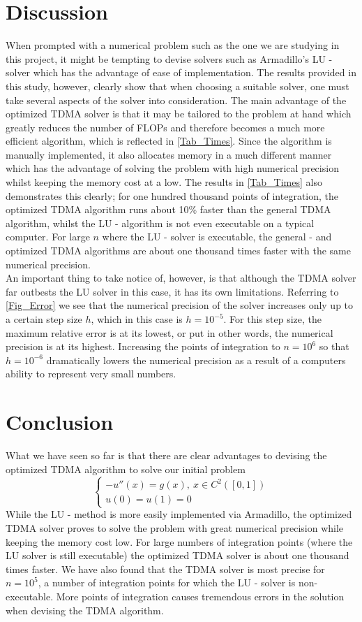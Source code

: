 \documentclass[a4paper, english]{amsart} %
\begin{document}
\section{Discussion}
When prompted with a numerical problem such as the one we are studying in this project, it might be tempting to devise solvers such as Armadillo's LU - solver which has the advantage of ease of implementation. The results provided in this study, however, clearly show that when choosing a suitable solver, one must take several aspects of the solver into consideration. The main advantage of the optimized TDMA solver is that it may be tailored to the problem at hand which greatly reduces the number of FLOPs and therefore becomes a much more efficient algorithm, which is reflected in \autoref{Tab_Times}. Since the algorithm is manually implemented, it also allocates memory in a much different manner which has the advantage of solving the problem with high numerical precision whilst keeping the memory cost at a low. The results in \autoref{Tab_Times} also demonstrates this clearly; for one hundred thousand points of integration, the optimized TDMA algorithm runs about 10\% faster than the general TDMA algorithm, whilst the LU - algorithm is not even executable on a typical computer. For large $n$ where the LU - solver is executable, the general - and optimized TDMA algorithms are about one thousand times faster with the same numerical precision.\\

An important thing to take notice of, however, is that although the TDMA solver far outbests the LU solver in this case, it has its own limitations. Referring to \autoref{Fig_Error} we see that the numerical precision of the solver increases only up to a certain step size $h$, which in this case is $h = 10^{-5}$. For this step size, the maximum relative error is at its lowest, or put in other words, the numerical precision is at its highest. Increasing the points of integration to $n = 10^6$ so that $h = 10^{-6}$ dramatically lowers the numerical precision as a result of a computers ability to represent very small numbers. 
\section{Conclusion}
What we have seen so far is that there are clear advantages to devising the optimized TDMA algorithm to solve our initial problem 
$$
\begin{cases}
-u''(x) = g(x), \ x\in C^2([0,1])\\
u(0) = u(1) = 0
\end{cases}
$$
While the LU - method is more easily implemented via Armadillo, the optimized TDMA solver proves to solve the problem with great numerical precision while keeping the memory cost low. For large numbers of integration points (where the LU solver is still executable) the optimized TDMA solver is about one thousand times faster. We have also found that the TDMA solver is most precise for $n = 10^5$, a number of integration points for which the LU - solver is non-executable. More points of integration causes tremendous errors in the solution when devising the TDMA algorithm. 
\newpage
\appendix
\end{document}
